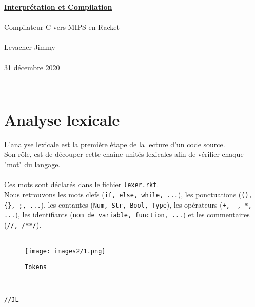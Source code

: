 \documentclass[a4paper,10pt]{article}
\begin{document}
\begin{center}
{\Large\bf
\underline{Interprétation et Compilation}}~~~~\\~\\
Compilateur C vers MIPS en Racket\\~\\
Levacher Jimmy\\~\\
31 décembre 2020
\end{center}~

\section{Analyse lexicale}
L’analyse lexicale est la première étape de la lecture d’un code source.\\
Son rôle, est de découper cette chaîne unités lexicales afin de vérifier chaque "mot" du langage.\\\\
Ces mots sont déclarés dans le fichier {\tt lexer.rkt}.\\
Nous retrouvons les mots clefs ({\tt if, else, while, ...}), les ponctuations ({\tt (), \{\}, ;, ...}), les contantes ({\tt Num, Str, Bool, Type}), les opérateurs ({\tt +, -, *, ...}), les identifiants ({\tt nom de variable, function, ...}) et les commentaires ({\tt //, /**/}).\\\\


\begin{figure}[h]
\begin{center}
    \texttt{[image: images2/1.png]}
\end{center}
\caption{\label{fig:1}{\tt Tokens}}
\end{figure}~\\


\begin{verbatim}
//JL
\end{verbatim}
\pagestyle{plain}
\end{document}
